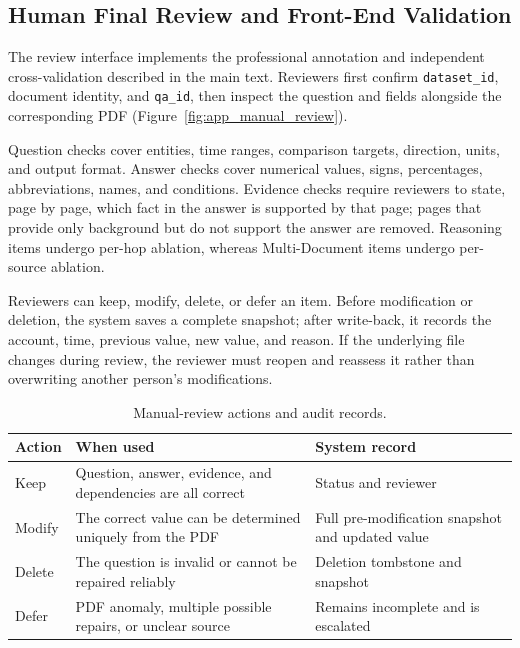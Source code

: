 \documentclass{article} %
\begin{document}
\subsection{Human Final Review and Front-End Validation}
\label{app:human_review}

The review interface implements the professional annotation and independent cross-validation described in the main text. Reviewers first confirm \texttt{dataset\_\allowbreak id}, document identity, and \texttt{qa\_\allowbreak id}, then inspect the question and fields alongside the corresponding PDF (Figure~\ref{fig:app_manual_review}).

Question checks cover entities, time ranges, comparison targets, direction, units, and output format. Answer checks cover numerical values, signs, percentages, abbreviations, names, and conditions. Evidence checks require reviewers to state, page by page, which fact in the answer is supported by that page; pages that provide only background but do not support the answer are removed. Reasoning items undergo per-hop ablation, whereas Multi-Document items undergo per-source ablation.


Reviewers can keep, modify, delete, or defer an item. Before modification or deletion, the system saves a complete snapshot; after write-back, it records the account, time, previous value, new value, and reason. If the underlying file changes during review, the reviewer must reopen and reassess it rather than overwriting another person's modifications.

\begin{table}[!htb]
\centering
\caption{Manual-review actions and audit records.}
\label{tab:app_human_actions}
\small
\begin{tabularx}{\linewidth}{l X X}
\toprule
\textbf{Action} & \textbf{When used} & \textbf{System record} \\
\midrule
Keep & Question, answer, evidence, and dependencies are all correct & Status and reviewer \\
Modify & The correct value can be determined uniquely from the PDF & Full pre-modification snapshot and updated value \\
Delete & The question is invalid or cannot be repaired reliably & Deletion tombstone and snapshot \\
Defer & PDF anomaly, multiple possible repairs, or unclear source & Remains incomplete and is escalated \\
\bottomrule
\end{tabularx}
\end{table}
\end{document}
